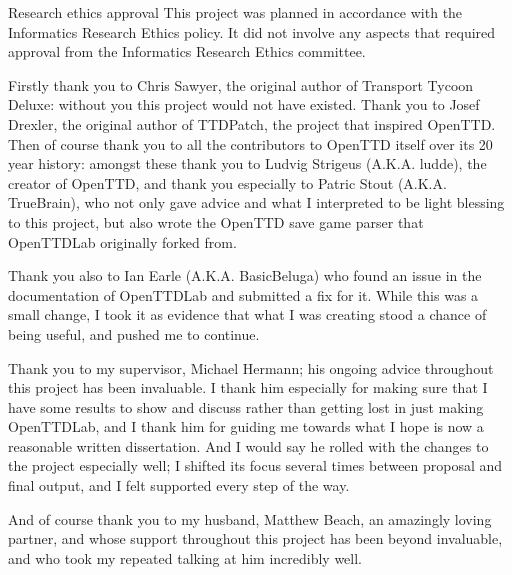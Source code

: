 \documentclass[logo,msc,dsti]{style/infthesis}    %
\begin{document}
\begin{preliminary}
\maketitle

\newenvironment{ethics}
   {\begin{frontenv}{Research ethics approval}{\LARGE}}
   {\end{frontenv}\newpage}

\begin{ethics}
This project was planned in accordance with the Informatics Research
Ethics policy. It did not involve any aspects that required approval
from the Informatics Research Ethics committee.
\standarddeclaration
\end{ethics}

\begin{acknowledgements}

Firstly thank you to Chris Sawyer, the original author of Transport Tycoon Deluxe: without you this project would not have existed. Thank you to Josef Drexler, the original author of TTDPatch, the project that inspired OpenTTD. Then of course thank you to all the contributors to OpenTTD itself over its 20 year history: amongst these thank you to Ludvig Strigeus (A.K.A. ludde), the creator of OpenTTD, and thank you especially to Patric Stout (A.K.A. TrueBrain), who not only gave advice and what I interpreted to be light blessing to this project, but also wrote the OpenTTD save game parser that OpenTTDLab originally forked from.

Thank you also to Ian Earle (A.K.A. BasicBeluga) who found an issue in the documentation of OpenTTDLab and submitted a fix for it. While this was a small change, I took it as evidence that what I was creating stood a chance of being useful, and pushed me to continue.

Thank you to my supervisor, Michael Hermann; his ongoing advice throughout this project has been invaluable. I thank him especially for making sure that I have some results to show and discuss rather than getting lost in just making OpenTTDLab, and I thank him for guiding me towards what I hope is now a reasonable written dissertation. And I would say he rolled with the changes to the project especially well; I shifted its focus several times between proposal and final output, and I felt supported every step of the way.

And of course thank you to my husband, Matthew Beach, an amazingly loving partner, and whose support throughout this project has been beyond invaluable, and who took my repeated talking at him incredibly well.

\end{acknowledgements}

\tableofcontents

\end{preliminary}
\end{document}
